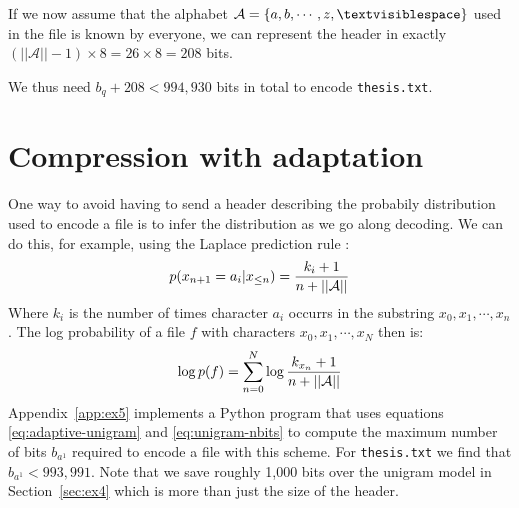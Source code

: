 \documentclass[10pt,a4paper,oneside,onecolumn]{article}
\newcommand*{\thesisTXT}{{\tt thesis.txt}\xspace}
\newcommand*{\norm}[1]{\ensuremath{\left|\left|#1\right|\right|}}
\newcommand*{\lbr}{\ensuremath{\left\{}}
\newcommand*{\rbr}{\ensuremath{\right\}}}
\begin{document}
If we now assume that the alphabet $\mathcal{A} = \lbr a, b, \cdots, z,
\textvisiblespace \rbr$ used in the file is known by everyone\footnotemark, we
can represent the header in exactly $(\norm{\mathcal{A}} - 1) \times 8 = 26
\times 8 = 208$ bits.\footnotemark
{}

We thus need $b_q + 208 < 994,930$ bits in total to encode \thesisTXT.


\section{Compression with adaptation}\label{sec:ex5}

One way to avoid having to send a header describing the probabily distribution
used to encode a file is to infer the distribution as we go along decoding. We
can do this, for example, using the Laplace prediction rule
\cite[p.~2]{it-assign}:
\begin{equation}
    p(x_{n+1}=a_i|x_{\le n}) = {k_i + 1 \over n + \norm{\mathcal{A}}}
\end{equation}
Where $k_i$ is the number of times character $a_i$ occurrs in the substring
$x_0, x_1, \cdots, x_n$.
The log probability of a file $f$ with characters $x_0, x_1, \cdots, x_N$ then
is:
\begin{equation}\label{eq:adaptive-unigram}
    \log p(f) = \sum\limits_{n = 0}^N \log {k_{x_n} + 1 \over n + \norm{\mathcal{A}}}
\end{equation}
Appendix~\ref{app:ex5} implements a Python program that uses equations
\eqref{eq:adaptive-unigram} and \eqref{eq:unigram-nbits} to compute the maximum
number of bits $b_{a^1}$ required to encode a file with this scheme. For
\thesisTXT we find that $b_{a^1} < 993,991$. Note that we save roughly 1,000
bits over the unigram model in Section~\ref{sec:ex4} which is more than just the
size of the header.
\end{document}
